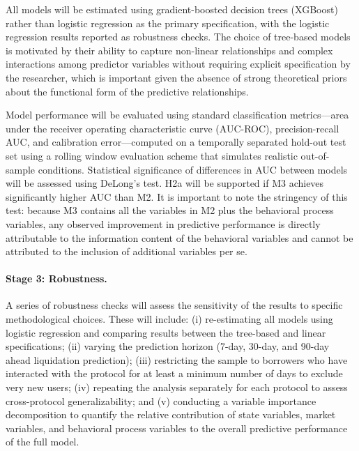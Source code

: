 All models will be estimated using gradient-boosted decision trees (XGBoost) rather than logistic regression as the primary specification, with the logistic regression results reported as robustness checks. The choice of tree-based models is motivated by their ability to capture non-linear relationships and complex interactions among predictor variables without requiring explicit specification by the researcher, which is important given the absence of strong theoretical priors about the functional form of the predictive relationships.

Model performance will be evaluated using standard classification metrics—area under the receiver operating characteristic curve (AUC-ROC), precision-recall AUC, and calibration error—computed on a temporally separated hold-out test set using a rolling window evaluation scheme that simulates realistic out-of-sample conditions. Statistical significance of differences in AUC between models will be assessed using DeLong's test. H2a will be supported if M3 achieves significantly higher AUC than M2. It is important to note the stringency of this test: because M3 contains all the variables in M2 plus the behavioral process variables, any observed improvement in predictive performance is directly attributable to the information content of the behavioral variables and cannot be attributed to the inclusion of additional variables per se.

\paragraph{Stage 3: Robustness.} A series of robustness checks will assess the sensitivity of the results to specific methodological choices. These will include: (i) re-estimating all models using logistic regression and comparing results between the tree-based and linear specifications; (ii) varying the prediction horizon (7-day, 30-day, and 90-day ahead liquidation prediction); (iii) restricting the sample to borrowers who have interacted with the protocol for at least a minimum number of days to exclude very new users; (iv) repeating the analysis separately for each protocol to assess cross-protocol generalizability; and (v) conducting a variable importance decomposition to quantify the relative contribution of state variables, market variables, and behavioral process variables to the overall predictive performance of the full model.
